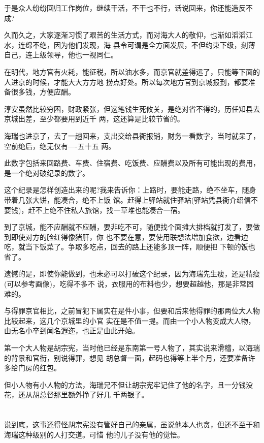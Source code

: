 \documentclass[11pt,a4paper,onecolumn]{article}
\begin{document}
于是众人纷纷回归工作岗位，继续干活，不干也不行，话说回来，你还能造反不成?

久而久之，大家逐渐习惯了艰苦的生活方式，而对海大人的敬仰，也渐如滔滔江水，连绵不绝，因为他们发现，海
县令可谓是全方面发展，不但约束下级，刻薄自己，连上级领导，他也一视同仁。

在明代，地方官有火耗，能征税，所以油水多，而京官就差得远了，只能等下面的人进京的时候，才能大大方方地
捞点好处。所以每次地方官到京城报到，都要准备很多钱，方便应酬。

淳安虽然比较穷困，财政紧张，但这笔钱生死攸关，是绝对省不得的，历任知县去京城出差，至少都要用到近千
两，这还算是比较节省的。

海瑞也进京了，去了一趟回来，支出交给县衙报销，财务一看数字，当时就呆了，空前绝后，绝无仅有----五十五
两。

此数字包括来回路费、车费、住宿费、吃饭费、应酬费以及所有可能出现的费用，是一个绝对破纪录的数字。

这个纪录是怎样创造出来的呢?我来告诉你：上路时，要能走路，绝不坐车，随身带着几张大饼，能凑合，绝不上饭
馆。赶得上驿站就住驿站(驿站凭县衙介绍信不要钱)，赶不上绝不住私人旅馆，找一草堆也能凑合一宿。

到了京城，能不应酬就不应酬，要非吃不可，随便找个面摊大排档就打发了，要做到即使对方的脸红得像猪肝，你
也不要在意，要使用联想法增加食欲，边看边吃，就当下饭菜了。争取多吃点，回去的路上还能多顶一阵，顺便把
下顿的饭也省了。

遗憾的是，即使你能做到，也未必可以打破这个纪录，因为海瑞先生瘦，还是精瘦(可以参考画像)，吃得不多不
说，衣服用的布料也少，想要超越他，那是非常困难的。

与得罪京官相比，之前冒犯下属实在是件小事，但要和后来他得罪的那两位大人物比较起来，这几个京城里的小官
实在是不值一提。而由一个小人物变成大人物，由无名小卒到闻名遐迩，也正是由此开始。

第一个大人物是胡宗宪，当时他已经是东南第一号人物了，其实说来滑稽，以海瑞的背景和官衔，别说得罪，想见
胡总督一面，起码也得等上半个月，还要准备许多给门房的红包。

但小人物有小人物的方法，海瑞兄不但让胡宗宪牢记住了他的名字，且一分钱没花，还从胡总督那里额外挣了好几
千两银子。

\section[\thesection]{}

说到底，这事还得怪胡宗宪没有管好自己的亲属，虽说他本人也贪，但还不至于和海瑞这种级别的人打交道。可惜
他的儿子没有他的觉悟。
\end{document}
